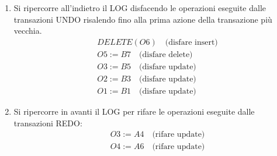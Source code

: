 \documentclass[a4paper]{article}
\begin{document}
\begin{exercise}
\begin{enumerate}
    \item Si ripercorre all'indietro il LOG disfacendo le operazioni eseguite dalle
      transazioni UNDO risalendo fino alla prima azione della transazione più vecchia.
      \[
        \begin{aligned}
          &DELETE(O6) \quad \text{(disfare insert)} \\
          &O5 := B7 \quad \text{(disfare delete)} \\
          &O3 := B5 \quad \text{(disfare update)} \\
          &O2 := B3 \quad \text{(disfare update)} \\
          &O1 := B1 \quad \text{(disfare update)}
        \end{aligned}
      \] 

    \item Si ripercorre in avanti il LOG per rifare le operazioni eseguite dalle
      transazioni REDO:
      \[
        \begin{aligned}
          &O3 := A4 \quad \text{(rifare update)} \\
          &O4 := A6 \quad \text{(rifare update)} \\
        \end{aligned}
      \]
  \end{enumerate}
\end{exercise}
\end{document}
